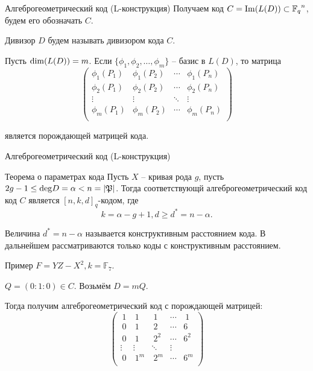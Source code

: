 \documentclass{beamer}
\begin{document}
\begin {frame} {Алгеброгеометрический код (L-конструкция)}
Получаем код $C = {\rm Im}(L(D)) \subset {\mathbb F_q}^n$, будем его обозначать $C.$

Дивизор $D$ будем называть дивизором кода $C$.
\newline

Пусть ${\rm dim}(L(D)) = m$. Если $\{\phi_1, \phi_2, \dots, \phi_ m\}$ -- базис в $L(D)$, то матрица
$$\begin{pmatrix}
\phi_1 (P_1) & \phi_1 (P_2) & \cdots & \phi_1 (P_n) \\
\phi_2 (P_1) & \phi_2 (P_2) & \cdots & \phi_2 (P_n) \\
\vdots & \vdots & \ddots & \vdots \\
\phi_ m (P_1) & \phi_ m (P_2) & \cdots &\phi_ m (P_n) \\
\end{pmatrix}$$

является порождающей матрицей кода.
\end {frame}

\begin {frame} {Алгеброгеометрический код (L-конструкция)}

\begin {block} {Теорема о параметрах кода}
Пусть $X$ -- кривая рода $g$, пусть $ 2g-1 \le {\rm deg}D = \alpha < n = |{\mathfrak P}|$. Тогда соответствующй алгеброгеометрический код код $C$ является $[n, k, d]_q$-кодом, где
$$k = \alpha - g + 1, d \ge d^* = n - \alpha.$$
\end {block}

Величина $d^* = n - \alpha$ называется конструктивным расстоянием кода. В дальнейшем рассматриваются только коды с конструктивным расстоянием.
\end {frame}

\begin {frame} {Пример}
$F = YZ - X^2, k = {\mathbb F}_7$.

$Q = (0 : 1 : 0) \in C$. Возьмём $D = mQ$.

Тогда получим алгеброгеометрический код с порождающей матрицей:
$$\begin{pmatrix}
\ 1 & \ 1 & \ 1 & \cdots & \ 1 \\
\ 0 & \ 1 & \ 2 & \cdots & 6 \\
\ 0 & \ 1 & \ 2^2 & \cdots & 6^2 \\
\vdots & \vdots & \ddots & \vdots \\
\ 0 & \ 1^m & \ 2^m & \cdots & 6^ m\\
\end{pmatrix}$$

\end {frame}
\end{document}

